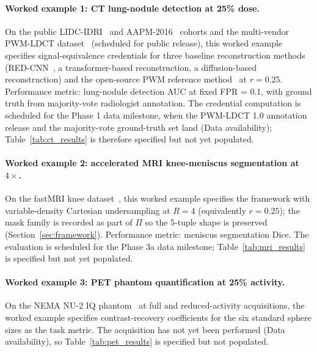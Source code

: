 \documentclass[twoside,11pt]{article}
\newcommand{\todo}[1]{\textcolor{red}{\textbf{[TODO: #1]}}}
\newcommand{\todoTable}[2]{%
  \begin{table}[ht]\centering%
    \fbox{\parbox{0.85\linewidth}{\centering\todo{TABLE: #2}}}%
    \caption{#2 (placeholder; populate when data lands).}\label{#1}%
  \end{table}}
\begin{document}
\paragraph{Worked example 1: CT lung-nodule detection at 25\% dose.} On the public LIDC-IDRI~\citep{lidc_idri} and AAPM-2016~\citep{aapm2016challenge} cohorts and the multi-vendor PWM-LDCT dataset~\citep{ws1dataset} (scheduled for public release), this worked example specifies signal-equivalence credentials for three baseline reconstruction methods (RED-CNN~\citep{chen2017redcnn}, a transformer-based reconstruction, a diffusion-based reconstruction) and the open-source PWM reference method~\citep{ws3reference} at $r = 0.25$. Performance metric: lung-nodule detection AUC at fixed FPR = 0.1, with ground truth from majority-vote radiologist annotation. The credential computation is scheduled for the Phase 1 data milestone, when the PWM-LDCT 1.0 annotation release and the majority-vote ground-truth set land (Data availability); Table~\ref{tab:ct_results} is therefore specified but not yet populated.

\todoTable{tab:ct_results}{Signal-equivalence credentials for four CT reconstruction methods at $r = 0.25$, task = lung-nodule detection AUC}

\paragraph{Worked example 2: accelerated MRI knee-meniscus segmentation at $4\times$.} On the fastMRI knee dataset~\citep{fastmri}, this worked example specifies the framework with variable-density Cartesian undersampling at $R = 4$ (equivalently $r = 0.25$); the mask family is recorded as part of $\Pi$ so the 5-tuple shape is preserved (Section~\ref{sec:framework}). Performance metric: meniscus segmentation Dice. The evaluation is scheduled for the Phase 3a data milestone; Table~\ref{tab:mri_results} is specified but not yet populated.

\todoTable{tab:mri_results}{Signal-equivalence credentials for MRI reconstruction methods at $r = 0.25$ (4$\times$ acceleration), task = knee-meniscus segmentation Dice}

\paragraph{Worked example 3: PET phantom quantification at 25\% activity.} On the NEMA NU-2 IQ phantom~\citep{nema_nu2} at full and reduced-activity acquisitions, the worked example specifies contrast-recovery coefficients for the six standard sphere sizes as the task metric. The acquisition has not yet been performed (Data availability), so Table~\ref{tab:pet_results} is specified but not populated.
\end{document}
